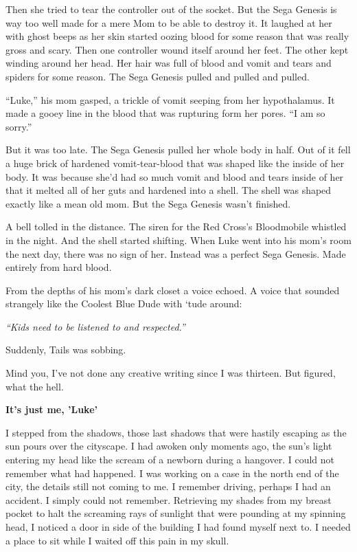 Then she tried to tear the controller out of the socket. But the
Sega Genesis is way too well made for a mere Mom to be able to
destroy it. It laughed at her with ghost beeps as her skin started
oozing blood for some reason that was really gross and scary. Then
one controller wound itself around her feet. The other kept winding
around her head. Her hair was full of blood and vomit and tears and
spiders for some reason. The Sega Genesis pulled and pulled and
pulled.



``Luke,'' his mom gasped, a trickle of vomit seeping from
her hypothalamus. It made a gooey line in the blood that was
rupturing form her pores. ``I am so sorry.''



But it was too late. The Sega Genesis pulled her whole body in
half. Out of it fell a huge brick of hardened vomit-tear-blood that
was shaped like the inside of her body. It was because she'd
had so much vomit and blood and tears inside of her that it melted
all of her guts and hardened into a shell. The shell was shaped
exactly like a mean old mom. But the Sega Genesis wasn't
finished.



A bell tolled in the distance. The siren for the Red Cross's
Bloodmobile whistled in the night. And the shell started shifting.
When Luke went into his mom's room the next day, there was no
sign of her. Instead was a perfect Sega Genesis. Made entirely from
hard blood.



From the depths of his mom's dark closet a voice echoed. A
voice that sounded strangely like the Coolest Blue Dude with
`tude around:



{\em ``Kids need to be listened to and
respected.''}



Suddenly, Tails was sobbing. 
 





Mind you, I've not done any creative writing since I was thirteen.
But figured, what the hell.



{\bf It's just me, 'Luke'}



I stepped from the shadows, those last shadows that were hastily
escaping as the sun pours over the cityscape. I had awoken only
moments ago, the sun's light entering my head like the scream of a
newborn during a hangover. I could not remember what had happened.
I was working on a case in the north end of the city, the details
still not coming to me. I remember driving, perhaps I had an
accident. I simply could not remember. Retrieving my shades from my
breast pocket to halt the screaming rays of sunlight that were
pounding at my spinning head, I noticed a door in side of the
building I had found myself next to. I needed a place to sit while
I waited off this pain in my skull.



